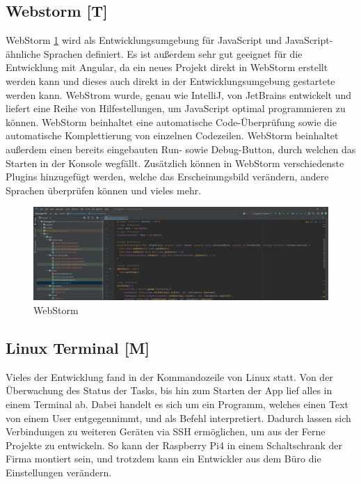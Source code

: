 \subsection{Webstorm [T]} 
WebStorm \ref{fig:impl:webstorm} wird als Entwicklungsumgebung für JavaScript und JavaScript-ähnliche Sprachen definiert. Es ist außerdem sehr gut geeignet für die Entwicklung mit Angular, da ein neues Projekt direkt in WebStorm erstellt werden kann und dieses auch direkt in der Entwicklungsumgebung gestartete werden kann. WebStrom wurde, genau wie IntelliJ, von JetBrains entwickelt und liefert eine Reihe von Hilfestellungen, um JavaScript optimal programmieren zu können. WebStorm beinhaltet eine automatische Code-Überprüfung sowie die automatische Komplettierung von einzelnen Codezeilen. WebStorm beinhaltet außerdem einen bereits eingebauten Run- sowie Debug-Button, durch welchen das Starten in der Konsole wegfällt. Zusätzlich können in WebStorm verschiedenste Plugins hinzugefügt werden, welche das Erscheinungsbild verändern, andere Sprachen überprüfen können und vieles mehr. \cite{webstormOfficialSite}

\begin{figure}[h t]
    \centering
    \includegraphics[scale=0.38]{pics/webstorm.jpg}
    \caption{WebStorm}
    \label{fig:impl:webstorm}
  \end{figure}


\subsection{Linux Terminal [M]} 
Vieles der Entwicklung fand in der Kommandozeile von Linux statt. Von der Überwachung des Status der Tasks, bis hin zum Starten der App lief alles in einem Terminal ab. Dabei handelt es sich um ein Programm, welches einen Text von einem User entgegennimmt, und als Befehl interpretiert. Dadurch lassen sich Verbindungen zu weiteren Geräten via SSH ermöglichen, um aus der Ferne Projekte zu entwickeln. So kann der Raspberry Pi4 in einem Schaltschrank der Firma montiert sein, und trotzdem kann ein Entwickler aus dem Büro die Einstellungen verändern.   

